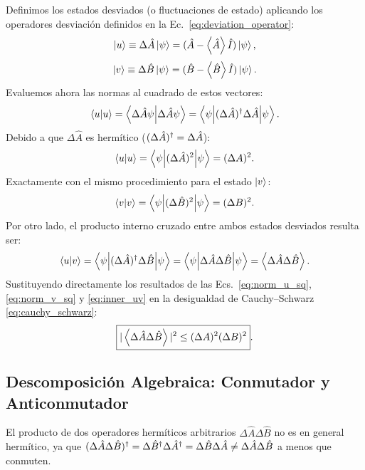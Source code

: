 Definimos los estados desviados (o fluctuaciones de estado) aplicando los operadores desviación definidos en la Ec.~\eqref{eq:deviation_operator}:
\begin{equation}
    \left| u \right\rangle \equiv \Delta\hat{A}\left| \psi \right\rangle = (\hat{A} - \left\langle \hat{A} \right\rangle\hat{I})\left| \psi \right\rangle,
    \label{eq:state_u}
\end{equation}
\begin{equation}
    \left| v \right\rangle \equiv \Delta\hat{B}\left| \psi \right\rangle = (\hat{B} - \left\langle \hat{B} \right\rangle\hat{I})\left| \psi \right\rangle.
    \label{eq:state_v}
\end{equation}
Evaluemos ahora las normas al cuadrado de estos vectores:
\begin{equation}
    \left\langle u \middle| u \right\rangle = \left\langle \Delta\hat{A}\psi \middle| \Delta\hat{A}\psi \right\rangle = \left\langle \psi \middle| (\Delta\hat{A})^\dagger\Delta\hat{A} \middle| \psi \right\rangle.
\end{equation}
Debido a que $\Delta\hat{A}$ es hermítico ($(\Delta\hat{A})^\dagger = \Delta\hat{A}$):
\begin{equation}
    \left\langle u \middle| u \right\rangle = \left\langle \psi \middle| (\Delta\hat{A})^2 \middle| \psi \right\rangle = (\Delta A)^2.
    \label{eq:norm_u_sq}
\end{equation}
Exactamente con el mismo procedimiento para el estado $\left| v \right\rangle$:
\begin{equation}
    \left\langle v \middle| v \right\rangle = \left\langle \psi \middle| (\Delta\hat{B})^2 \middle| \psi \right\rangle = (\Delta B)^2.
    \label{eq:norm_v_sq}
\end{equation}
Por otro lado, el producto interno cruzado entre ambos estados desviados resulta ser:
\begin{equation}
    \left\langle u \middle| v \right\rangle = \left\langle \psi \middle| (\Delta\hat{A})^\dagger\Delta\hat{B} \middle| \psi \right\rangle = \left\langle \psi \middle| \Delta\hat{A}\Delta\hat{B} \middle| \psi \right\rangle = \left\langle \Delta\hat{A}\Delta\hat{B} \right\rangle.
    \label{eq:inner_uv}
\end{equation}
Sustituyendo directamente los resultados de las Ecs.~\eqref{eq:norm_u_sq}, \eqref{eq:norm_v_sq} y \eqref{eq:inner_uv} en la desigualdad de Cauchy--Schwarz \eqref{eq:cauchy_schwarz}:
\begin{equation}
    \boxed{|\left\langle \Delta\hat{A}\Delta\hat{B} \right\rangle|^2 \le (\Delta A)^2 (\Delta B)^2}.
    \label{eq:cs_applied}
\end{equation}

\subsection{Descomposición Algebraica: Conmutador y Anticonmutador}

El producto de dos operadores hermíticos arbitrarios $\Delta\hat{A}\Delta\hat{B}$ no es en general hermítico, ya que $(\Delta\hat{A}\Delta\hat{B})^\dagger = \Delta\hat{B}^\dagger\Delta\hat{A}^\dagger = \Delta\hat{B}\Delta\hat{A} \neq \Delta\hat{A}\Delta\hat{B}$ a menos que conmuten.

